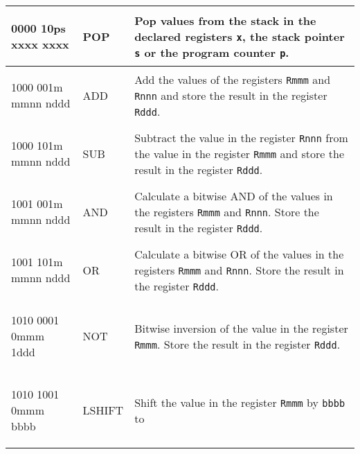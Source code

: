 \documentclass{report}
\newcommand{\boxchar}[1]{\begin{boxednumbers} #1
\end{boxednumbers}}
\begin{document}
\begin{center}
\begin{longtable}{m{}m{}m{}}
        \hline
        \boxchar{0000 10ps xxxx xxxx} & POP       & Pop values from the stack in the declared registers \texttt{x}, the stack pointer \texttt{s} or the program counter \texttt{p}.\\
        \hline
        \boxchar{1000 001m mmnn nddd} & ADD       & Add the values of the registers
                                                    \texttt{Rmmm} and \texttt{Rnnn} and
                                                    store the result in the register
                                                    \texttt{Rddd}.\\
                                                    \hline
        \boxchar{1000 101m mmnn nddd} & SUB       & Subtract the value in the register
                                                    \texttt{Rnnn} from the value in
                                                    the register \texttt{Rmmm} and store
                                                    the result in the register
                                                    \texttt{Rddd}.\\
                                                    \hline
        \boxchar{1001 001m mmnn nddd} & AND       & Calculate a bitwise AND of the values in
                                                    the registers \texttt{Rmmm}
                                                    and \texttt{Rnnn}. Store the result
                                                    in the register \texttt{Rddd}.\\
                                                    \hline
        \boxchar{1001 101m mmnn nddd} & OR        & Calculate a bitwise OR of the values
                                                    in the registers \texttt{Rmmm} and
                                                    \texttt{Rnnn}. Store the result in
                                                    the register \texttt{Rddd}.\\
                                                    \hline
        \boxchar{1010 0001 0mmm 1ddd} & NOT       & Bitwise inversion of the value in
                                                    the register \texttt{Rmmm}. Store
                                                    the result in the register
                                                    \texttt{Rddd}.\\
                                                    \hline
        \boxchar{1010 1001 0mmm bbbb} & LSHIFT    & Shift the value in the register
                                                    \texttt{Rmmm} by \texttt{bbbb} to

\end{longtable}
\end{center}
\end{document}
